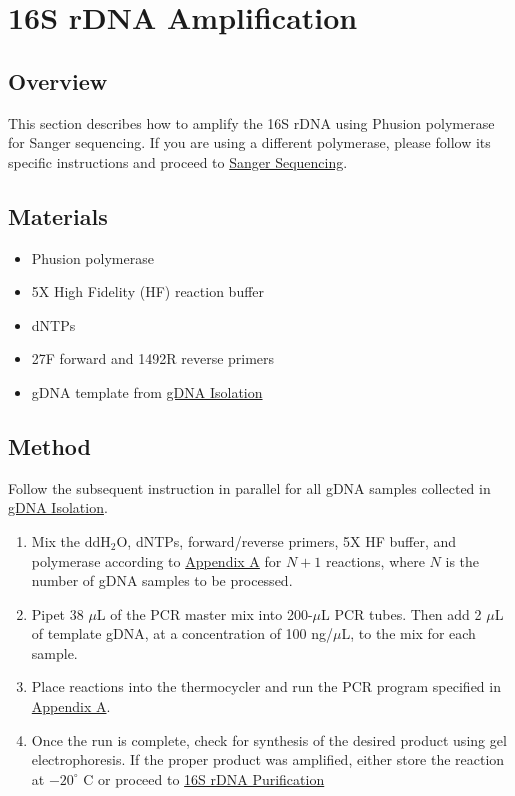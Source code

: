 \documentclass[twocolumn]{article}
\begin{document}
\section{16S rDNA Amplification}\label{1rA}
\subsection{Overview}
This section describes how to amplify the 16S rDNA using Phusion polymerase for Sanger sequencing.
If you are using a different polymerase,
please follow its specific instructions and proceed to \hyperref[SS]{Sanger Sequencing}.

\subsection{Materials}
\begin{itemize}
  \item Phusion polymerase
  \item 5X High Fidelity (HF) reaction buffer
  \item dNTPs
  \item 27F forward and 1492R reverse primers
  \item gDNA template from \hyperref[GI]{gDNA Isolation}
\end{itemize}

\subsection{Method}
Follow the subsequent instruction in parallel for all gDNA samples collected in \hyperref[GI]{gDNA Isolation}.
\begin{enumerate}
  \item Mix the ddH$_2$O, dNTPs, forward\slash reverse primers, 5X HF buffer, and polymerase according to \hyperref[aA]{Appendix A} for $N+1$ reactions, where $N$ is the number of gDNA samples to be processed.
  \item Pipet 38 $\mu$L of the PCR master mix into 200-$\mu$L PCR tubes. Then add 2 $\mu$L of template gDNA, at a concentration of 100 ng\slash $\mu$L, to the mix for each sample.
  \item Place reactions into the thermocycler and run the PCR program specified in \hyperref[aA]{Appendix A}.
  \item Once the run is complete, check for synthesis of the desired product using gel electrophoresis. If the proper product was amplified, either store the reaction at $-20^\circ$ C or proceed to \hyperref[1rP]{16S rDNA Purification}
\end{enumerate}
\end{document}
